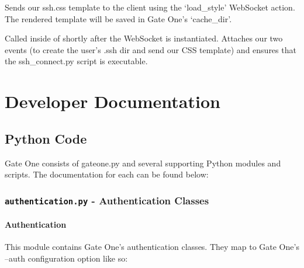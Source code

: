 \documentclass[letterpaper,10pt,openany]{sphinxmanual}
\begin{document}
\begin{fulllineitems}
\label{Applications/terminal/plugin_ssh:ssh.send_ssh_css_template}
Sends our ssh.css template to the client using the `load\_style'
WebSocket action.  The rendered template will be saved in Gate One's
`cache\_dir'.

\end{fulllineitems}


\begin{fulllineitems}
\label{Applications/terminal/plugin_ssh:ssh.initialize}
Called inside of  shortly after the
WebSocket is instantiated.  Attaches our two  events
(to create the user's .ssh dir and send our CSS template) and ensures that
the ssh\_connect.py script is executable.

\end{fulllineitems}



\section{Developer Documentation}
\label{Developer/index:developer-docs}\label{Developer/index:developer-documentation}\label{Developer/index::doc}

\subsection{Python Code}
\label{Developer/index:python-code}
Gate One consists of gateone.py and several supporting Python modules and scripts.  The documentation for each can be found below:


\subsubsection{\texttt{authentication.py} - Authentication Classes}
\label{Developer/authentication:module-gateone.auth.authentication}\label{Developer/authentication::doc}\label{Developer/authentication:authentication-py-authentication-classes}

\paragraph{Authentication}
\label{Developer/authentication:authentication}\label{Developer/authentication:auth-py}
This module contains Gate One's authentication classes.  They map to Gate One's
--auth configuration option like so:
\end{document}
